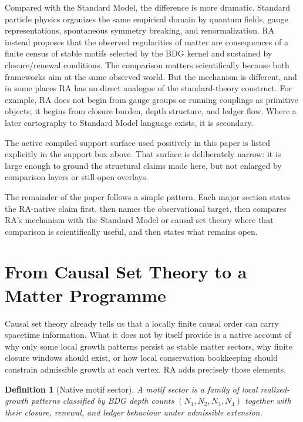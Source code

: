 \documentclass[11pt]{article}
\newtheorem{definition}{Definition}
\begin{document}
Compared with the Standard Model, the difference is more dramatic. Standard particle physics organizes the same empirical domain by quantum fields, gauge representations, spontaneous symmetry breaking, and renormalization. RA instead proposes that the observed regularities of matter are consequences of a finite census of stable motifs selected by the BDG kernel and sustained by closure/renewal conditions. The comparison matters scientifically because both frameworks aim at the same observed world. But the mechanism is different, and in some places RA has no direct analogue of the standard-theory construct. For example, RA does not begin from gauge groups or running couplings as primitive objects; it begins from closure burden, depth structure, and ledger flow. Where a later cartography to Standard Model language exists, it is secondary.

The active compiled support surface used positively in this paper is listed explicitly in the support box above. That surface is deliberately narrow: it is large enough to ground the structural claims made here, but not enlarged by comparison layers or still-open overlays.

The remainder of the paper follows a simple pattern. Each major section states the RA-native claim first, then names the observational target, then compares RA's mechanism with the Standard Model or causal set theory where that comparison is scientifically useful, and then states what remains open.

\section{From Causal Set Theory to a Matter Programme}

Causal set theory already tells us that a locally finite causal order can carry spacetime information. What it does not by itself provide is a native account of why only some local growth patterns persist as stable matter sectors, why finite closure windows should exist, or how local conservation bookkeeping should constrain admissible growth at each vertex. RA adds precisely those elements.

\begin{definition}[Native motif sector]
A \emph{motif sector} is a family of local realized-growth patterns classified by BDG depth counts $(N_1,N_2,N_3,N_4)$ together with their closure, renewal, and ledger behaviour under admissible extension.
\end{definition}
\end{document}
